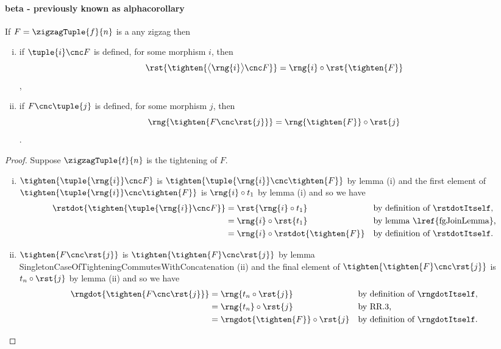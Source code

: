 \paragraph*{beta - previously known as alphacorollary}
\begin{lemma}
If $F=\zigzagTuple{f}{n}$ is a any zigzag then
\begin{enumerate}[(i)]
\item if $\tuple{i} \cnc F$ is defined, 
for some morphism $i$,  
then 
$$\rst{\tighten{\bigl\langle \rng{i} \bigr\rangle \cnc F}}
                = \rng{i} \circ \rst{\tighten{F}}$$, 
\item if $F \cnc \tuple{j}$ is defined, 
for some morphism $j$, then 
$$\rng{\tighten{F \cnc \rst{j}}} 
                = \rng{\tighten{F}} \circ \rst{j}$$. 
\end{enumerate}
\end{lemma}
\begin{proof}
Suppose $\zigzagTuple{t}{n}$ is the tightening of $F$.
\begin{enumerate}[(i)]
\item %
$\tighten{\tuple{\rng{i}} \cnc F}$ is
$\tighten{\tuple{\rng{i}} \cnc \tighten{F}}$
by lemma 
(i)
and the first element of
$\tighten{\tuple{\rng{i}} \cnc \tighten{F}}$
is $\rng{i} \circ t_1$
by lemma  (i)
and so we have
\begin{align*}
\rstdot{\tighten{\tuple{\rng{i}} \cnc F}}
&= \rst{\rng{i} \circ t_1}
          && \mbox{by definition of \rstdotItself,} \\
&= \rng{i} \circ \rst{t_1}
          && \mbox{by lemma \lref{fgJoinLemma},} \\
&= \rng{i} \circ \rstdot{\tighten{F}}
          && \mbox{by definition of \rstdotItself.}
\end{align*}
\item %
$\tighten{F \cnc \rst{j}}$ is $\tighten{\tighten{F} \cnc \rst{j}}$
by lemma {SingletonCaseOfTighteningCommutesWithConcatenation} %
(ii) 
and the final element of $\tighten{\tighten{F} \cnc \rst{j}}$
is $t_n \circ \rst{j}$ by lemma  (ii)
and so we have
\begin{align*}
\rngdot{\tighten{F \cnc \rst{j}}}
&= \rng{t_n \circ \rst{j}} 
          && \mbox{by definition of \rngdotItself,} \\
&= \rng{t_n} \circ \rst{j}  
          &&\mbox{by RR.3,} \\
&= \rngdot{\tighten{F}} \circ \rst{j}
          && \mbox{by definition of \rngdotItself.} 
\end{align*}
\end{enumerate}
\end{proof}

